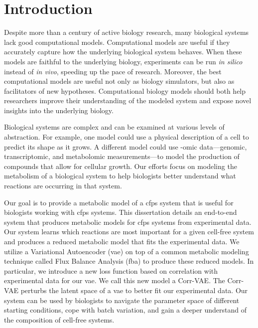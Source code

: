 \chapter{Introduction}
\setcounter{page}{1} 


Despite more than a century of active biology research, many biological systems lack good computational models.
Computational models are useful if they accurately capture how the underlying biological system behaves.
When these models are faithful to the underlying biology, experiments can be run \textit{in silico} instead of \textit{in vivo}, speeding up the pace of research.
Moreover, the best computational models are useful not only as biology simulators, but also as facilitators of new hypotheses.
Computational biology models should both help researchers improve their understanding of the modeled system and expose novel insights into the underlying biology.

Biological systems are complex and can be examined at various levels of abstraction.
For example, one model could use a physical description of a cell to predict its shape as it grows.
A different model could use -omic data---genomic, transcriptomic, and metabolomic measurements---to model the production of compounds that allow for cellular growth.
Our efforts focus on modeling the metabolism of a biological system to help biologists better understand what reactions are occurring in that system.

Our goal is to provide a metabolic model of a \gls{cfps} system that is useful for biologists working with \gls{cfps} systems.
This dissertation details an end-to-end system that produces metabolic models for \gls{cfps} systems from experimental data.
Our system learns which reactions are most important for a given cell-free system and produces a reduced metabolic model that fits the experimental data.
We utilize a Variational Autoencoder (\gls{vae}) on top of a common metabolic modeling technique called Flux Balance Analysis (\gls{fba}) to produce these reduced models.
In particular, we introduce a new loss function based on correlation with experimental data for our \gls{vae}.
We call this new model a Corr-VAE.
The Corr-VAE perturbs the latent space of a \gls{vae} to better fit our experimental data.
Our system can be used by biologists to navigate the parameter space of different starting conditions, cope with batch variation, and gain a deeper understand of the composition of cell-free systems.

